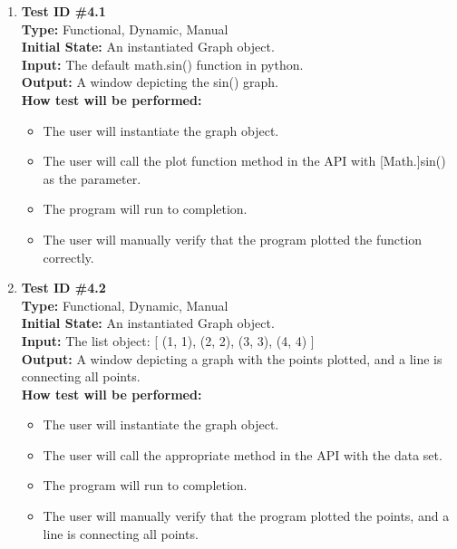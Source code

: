 \documentclass[12pt, titlepage]{article}
\begin{document}
		\begin{enumerate}
			\item{\textbf{Test ID \#4.1\\}}
			\textbf{Type:} Functional, Dynamic, Manual\\
			\textbf{Initial State:} An instantiated Graph object. \\
			\textbf{Input:} The default math.sin() function in python.\\
			\textbf{Output:}  A window depicting the sin() graph.\\
			\textbf{How test will be performed:}
				\begin{itemize}[label={--}]
					\item The user will instantiate the graph object.
					\item The user will call the plot function method in the API with [Math.]sin() as the parameter.
					\item The program will run to completion.
					\item The user will manually verify that the program plotted the function correctly.							
				\end{itemize}
					
			\item{\textbf{Test ID \#4.2\\}}
			\textbf{Type:} Functional, Dynamic, Manual\\
			\textbf{Initial State:} An instantiated Graph object.\\
			\textbf{Input:} The list object: [ (1, 1),  (2, 2), (3, 3), (4, 4) ]\\
			\textbf{Output:} A window depicting a graph with the points plotted, and a line is connecting all points. \\
			\textbf{How test will be performed:}
				\begin{itemize}[label={--}]
					\item The user will instantiate the graph object.
					\item The user will call the appropriate method in the API with the data set.
					\item The program will run to completion.
					\item The user will manually verify that the program plotted the points, and a line is connecting all points.
				\end{itemize}							
				

\end{enumerate}
\end{document}
